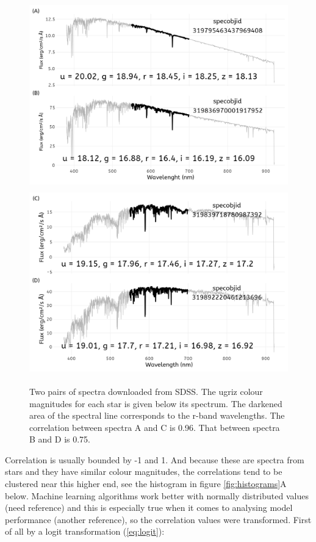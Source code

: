 \documentclass[a4paper,fleqn,usenatbib]{mnras}
\begin{document}
\begin{figure}
  \includegraphics[width=\columnwidth, height = 8cm]{figures/spectra1}
  \includegraphics[width=\columnwidth, height = 8cm]{figures/spectra2}
    \caption{Two pairs of spectra downloaded from SDSS. The ugriz colour magnitudes for each star is given below its spectrum. The darkened area of the spectral line corresponds to the r-band wavelengths. The correlation between spectra A and C is 0.96. That between spectra B and D is 0.75.}
    \label{fig:spectra}
\end{figure}

Correlation is usually bounded by -1 and 1. And because these are
spectra from stars and they have similar colour magnitudes, the
correlations tend to be clustered near this higher end, see the
histogram in figure \ref{fig:histograms}A below. Machine learning
algorithms work better with normally distributed values (need reference)
and this is especially true when it comes to analysing model performance
(another reference), so the correlation values were transformed. First
of all by a logit transformation (\ref{eq:logit}):
\end{document}
